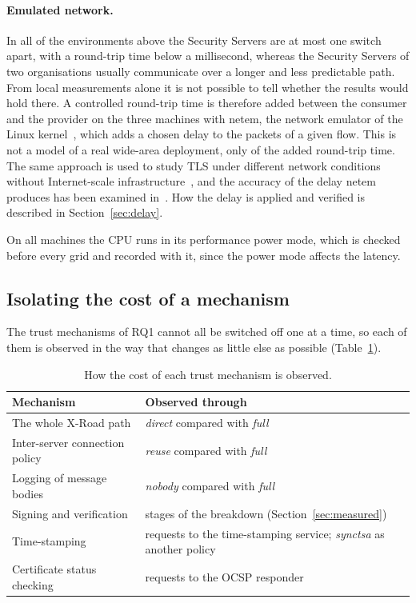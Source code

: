 \documentclass[conference,a4paper]{IEEEtran}
\begin{document}
\paragraph{Emulated network.} In all of the environments above the Security Servers are at most
one switch apart, with a round-trip time below a millisecond, whereas the Security Servers of two
organisations usually communicate over a longer and less predictable path. From local measurements
alone it is not possible to tell whether the results would hold there. A controlled round-trip time
is therefore added between the consumer and the provider on the three machines with netem, the
network emulator of the Linux kernel~\cite{hemminger2005}, which adds a chosen delay to the packets of
a given flow. This is not a model of a real wide-area deployment, only of the added round-trip time. The same approach is used to study TLS under different network conditions without
Internet-scale infrastructure~\cite{paquin2020}, and the accuracy of the delay netem produces has
been examined in~\cite{nussbaum2009,jurgelionis2011}. How the delay is applied and verified is
described in Section~\ref{sec:delay}.

On all machines the CPU runs in its performance power mode, which is checked before every grid and
recorded with it, since the power mode affects the latency.

\subsection{Isolating the cost of a mechanism}\label{sec:iso}

The trust mechanisms of RQ1 cannot all be switched off one at a time, so each of them is observed
in the way that changes as little else as possible (Table~\ref{tab:mech}).

\begin{table}[t]
\centering\small
\caption{How the cost of each trust mechanism is observed.}
\label{tab:mech}
\begin{tabular}{@{}p{}p{}@{}}
\toprule
Mechanism & Observed through \\
\midrule
The whole X-Road path & \emph{direct} compared with \emph{full} \\
Inter-server connection policy & \emph{reuse} compared with \emph{full} \\
Logging of message bodies & \emph{nobody} compared with \emph{full} \\
Signing and verification & stages of the breakdown (Section~\ref{sec:measured}) \\
Time-stamping & requests to the time-stamping service; \emph{synctsa} as another policy \\
Certificate status checking & requests to the OCSP responder \\
\bottomrule
\end{tabular}
\end{table}
\end{document}
